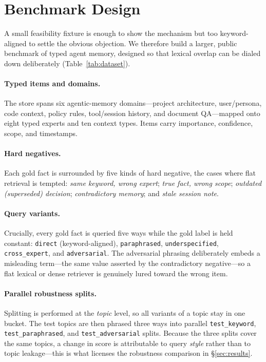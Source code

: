 \section{Benchmark Design}
\label{sec:benchmark}

A small feasibility fixture is enough to show the mechanism but too
keyword-aligned to settle the obvious objection. We therefore build a larger,
public benchmark of typed agent memory, designed so that lexical overlap can be
dialed down deliberately (Table~\ref{tab:dataset}).

\begin{table}[t]
  \centering
  \caption{MoC-RAG Benchmark statistics (deterministically generated).}
  \label{tab:dataset}
  
\end{table}

\paragraph{Typed items and domains.} The store spans six agentic-memory
domains---project architecture, user/persona, code context, policy rules,
tool/session history, and document QA---mapped onto eight typed experts and ten
context types. Items carry importance, confidence, scope, and timestamps.

\paragraph{Hard negatives.} Each gold fact is surrounded by five kinds of hard
negative, the cases where flat retrieval is tempted: \emph{same keyword, wrong
expert}; \emph{true fact, wrong scope}; \emph{outdated (superseded) decision};
\emph{contradictory memory}; and \emph{stale session note}.

\paragraph{Query variants.} Crucially, every gold fact is queried five ways while
the gold label is held constant: \texttt{direct} (keyword-aligned),
\texttt{paraphrased}, \texttt{underspecified}, \texttt{cross\_expert}, and
\texttt{adversarial}. The adversarial phrasing deliberately embeds a misleading
term---the same value asserted by the contradictory negative---so a flat
lexical or dense retriever is genuinely lured toward the wrong item.

\paragraph{Parallel robustness splits.} Splitting is performed at the
\emph{topic} level, so all variants of a topic stay in one bucket. The test
topics are then phrased three ways into parallel \texttt{test\_keyword},
\texttt{test\_paraphrased}, and \texttt{test\_adversarial} splits. Because the
three splits cover the same topics, a change in score is attributable to query
\emph{style} rather than to topic leakage---this is what licenses the robustness
comparison in \S\ref{sec:results}.

